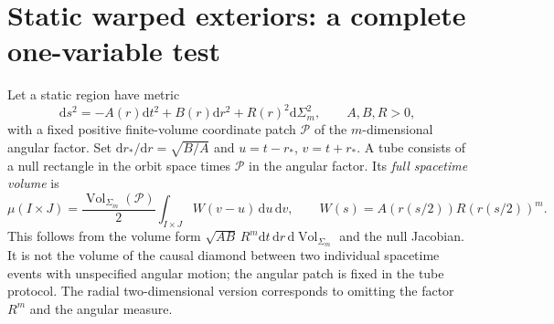 \documentclass[11pt,letterpaper]{article}
\newcommand{\vol}{\operatorname{Vol}}
\newcommand{\dd}{\mathrm{d}}
\begin{document}
\section{Static warped exteriors: a complete one-variable test}

Let a static region have metric
\begin{equation}
 \dd s^2=-A(r)\dd t^2+B(r)\dd r^2+R(r)^2\dd\Sigma_m^2,
 \qquad A,B,R>0 ,
\end{equation}
with a fixed positive finite-volume coordinate patch $\mathcal P$ of the $m$-dimensional angular factor. Set $\dd r_*/\dd r=\sqrt{B/A}$ and $u=t-r_*$, $v=t+r_*$. A tube consists of a null rectangle in the orbit space times $\mathcal P$ in the angular factor. Its \emph{full spacetime volume} is
\begin{equation}
 \mu(I\times J)=\frac{\vol_{\Sigma_m}(\mathcal P)}{2}
       \int_{I\times J} W(v-u)\,\dd u\,\dd v,\qquad
 W(s)=A(r(s/2))R(r(s/2))^m .
 \label{eq:tube}
\end{equation}
This follows from the volume form $\sqrt{AB}\,R^m\dd t\,\dd r\,\dd\vol_{\Sigma_m}$ and the null Jacobian. It is not the volume of the causal diamond between two individual spacetime events with unspecified angular motion; the angular patch is fixed in the tube protocol. The radial two-dimensional version corresponds to omitting the factor $R^m$ and the angular measure.
\end{document}
